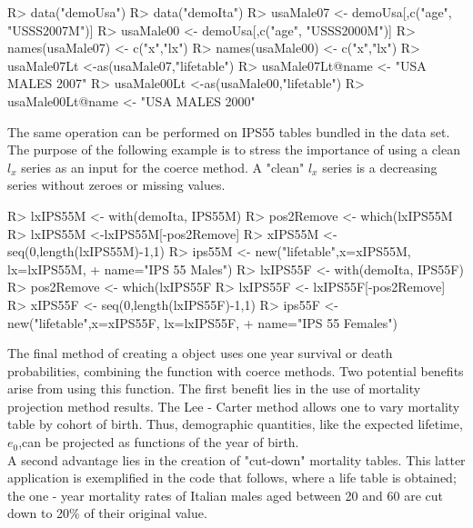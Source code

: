 \documentclass[nojss]{jss}
\begin{document}
\begin{Schunk}
\begin{Sinput}
R> data("demoUsa")
R> data("demoIta") 
R> usaMale07 <- demoUsa[,c("age", "USSS2007M")]
R> usaMale00 <- demoUsa[,c("age", "USSS2000M")]
R> names(usaMale07) <- c("x","lx")
R> names(usaMale00) <- c("x","lx")
R> usaMale07Lt <-as(usaMale07,"lifetable")
R> usaMale07Lt@name <- "USA MALES 2007"
R> usaMale00Lt <-as(usaMale00,"lifetable")
R> usaMale00Lt@name <- "USA MALES 2000"
\end{Sinput}
\end{Schunk}

The same operation can be performed on IPS55 tables bundled in the  data set. The purpose of the 
following example is to stress the importance of using a clean $l_x$ series as an input for the coerce method. A "clean" 
$l_x$ series is a decreasing series without zeroes or missing values.

\begin{Schunk}
\begin{Sinput}
R> lxIPS55M <- with(demoIta, IPS55M)
R> pos2Remove <- which(lxIPS55M %
R> lxIPS55M <-lxIPS55M[-pos2Remove]
R> xIPS55M <-seq(0,length(lxIPS55M)-1,1)
R> ips55M <- new("lifetable",x=xIPS55M, lx=lxIPS55M, 
+  		name="IPS 55 Males")
R> lxIPS55F <- with(demoIta, IPS55F)
R> pos2Remove <- which(lxIPS55F %
R> lxIPS55F <- lxIPS55F[-pos2Remove]
R> xIPS55F <- seq(0,length(lxIPS55F)-1,1)
R> ips55F <- new("lifetable",x=xIPS55F, lx=lxIPS55F, 
+  		name="IPS 55 Females")
\end{Sinput}
\end{Schunk}


The final method of creating a  object uses 
one year survival or death probabilities, combining the  function with 
 coerce methods. Two potential benefits arise from using this function. The first benefit lies in the use of mortality projection method
results. The Lee - Carter method \citep{Lee1992} allows one to vary mortality table
by cohort of birth.
Thus, demographic quantities, like the expected lifetime, $e_0$,can be projected as functions of the year of birth.\\
A second advantage lies in the creation of "cut-down" mortality tables. This latter
application is exemplified in the code that follows, where a  life
table is obtained; the one - year mortality rates of Italian males aged between 20 and 60 are cut down to 20\% of their original value.
\end{document}
